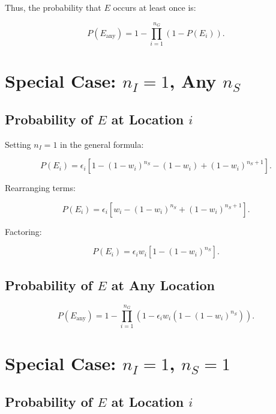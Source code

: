 \documentclass[11pt]{article}
\begin{document}
Thus, the probability that $ E $ occurs at least once is:

\begin{equation}
P(E_{\text{any}}) = 1 - \prod_{i=1}^{n_G} \left( 1 - P(E_i) \right).
\end{equation}

\section{Special Case: $ n_I = 1 $, Any $ n_S $}

\subsection{Probability of $ E $ at Location $ i $}

Setting $ n_I = 1 $ in the general formula:

\begin{equation}
P(E_i) = \epsilon_i \left[ 1 - (1 - w_i)^{n_S} - (1 - w_i) + (1 - w_i)^{n_S + 1} \right].
\end{equation}

Rearranging terms:

\begin{equation}
P(E_i) = \epsilon_i \left[ w_i - (1 - w_i)^{n_S} + (1 - w_i)^{n_S + 1} \right].
\end{equation}

Factoring:

\begin{equation}
P(E_i) = \epsilon_i w_i \left[ 1 - (1 - w_i)^{n_S} \right].
\end{equation}

\subsection{Probability of $ E $ at Any Location}

\begin{equation}
P(E_{\text{any}}) = 1 - \prod_{i=1}^{n_G} \left( 1 - \epsilon_i w_i \left( 1 - (1 - w_i)^{n_S} \right) \right).
\end{equation}

\section{Special Case: $ n_I = 1 $, $ n_S = 1 $}

\subsection{Probability of $ E $ at Location $ i $}
\end{document}
